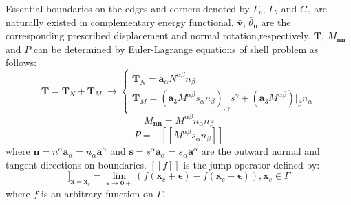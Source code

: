 Essential boundaries on the edges and corners denoted by $\Gamma_v$, $\Gamma_\theta$ and $C_v$ are naturally existed in complementary energy functional, $\bar{\boldsymbol v}$, $\bar \theta_{\boldsymbol n}$ are the corresponding prescribed displacement and normal rotation,respectively. $\boldsymbol T$, $M_{\boldsymbol{nn}}$ and $P$ can be determined by Euler-Lagrange equations of shell problem \cite{benzaken2021} as follows:
\begin{equation}
\boldsymbol T = \boldsymbol T_N + \boldsymbol T_M \; \rightarrow
\begin{cases}
\boldsymbol T_N = \boldsymbol a_\alpha N^{\alpha\beta}n_\beta \\
\boldsymbol T_M = (\boldsymbol a_3 M^{\alpha\beta}s_\alpha n_\beta)_{,\gamma} s^\gamma
+ (\boldsymbol a_3 M^{\alpha\beta})\vert_\beta n_\alpha
\end{cases}
\end{equation}
\begin{equation}
M_{\boldsymbol{nn}} = M^{\alpha\beta}n_\alpha n_\beta
\end{equation}
\begin{equation}
P = -[[M^{\alpha\beta}s_\alpha n_\beta]]
\end{equation}
where $\boldsymbol n = n^\alpha \boldsymbol a_\alpha = n_\alpha \boldsymbol a^\alpha$ and $\boldsymbol s = s^\alpha \boldsymbol a_\alpha = s_\alpha \boldsymbol a^\alpha$ are the outward normal and tangent directions on boundaries. $[[f]]$ is the jump operator defined by:
\begin{equation}
[[f]]_{\boldsymbol x = \boldsymbol x_c} = \lim_{\boldsymbol \epsilon\rightarrow \boldsymbol 0+}(f(\boldsymbol x_c + \boldsymbol \epsilon) - f(\boldsymbol x_c - \boldsymbol \epsilon)), \boldsymbol x_c \in \Gamma
\end{equation}
where $f$ is an arbitrary function on $\Gamma$.

